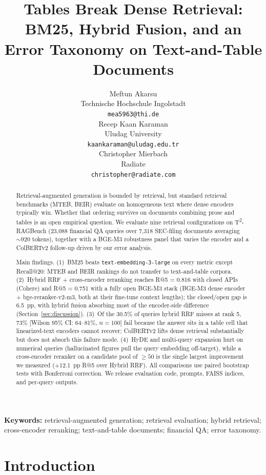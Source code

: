 \documentclass{article}
\title{Tables Break Dense Retrieval: BM25, Hybrid Fusion, and an Error Taxonomy on Text-and-Table Documents}
\author{
  Meftun Akarsu \\
  Technische Hochschule Ingolstadt \\
  \texttt{mea5963@thi.de} \\
  \And
  Recep Kaan Karaman \\
  Uludag University \\
  \texttt{kaankaraman@uludag.edu.tr} \\
  \And
  Christopher Mierbach \\
  Radiate \\
  \texttt{christopher@radiate.com}
}
\begin{document}
\maketitle

\begin{abstract}
Retrieval-augmented generation is bounded by retrieval, but standard retrieval benchmarks (MTEB, BEIR) evaluate on homogeneous text where dense encoders typically win. Whether that ordering survives on documents combining prose and tables is an open empirical question. We evaluate nine retrieval configurations on T\textsuperscript{2}-RAGBench (23{,}088 financial QA queries over 7{,}318 SEC-filing documents averaging ${\sim}920$ tokens), together with a BGE-M3 robustness panel that varies the encoder and a ColBERTv2 follow-up driven by our error analysis.

Main findings. (1)~BM25 beats \texttt{text-embedding-3-large} on every metric except Recall@20: MTEB and BEIR rankings do not transfer to text-and-table corpora. (2)~Hybrid RRF + cross-encoder reranking reaches R@5 = 0.816 with closed APIs (Cohere) and R@5 = 0.751 with a fully open BGE-M3 stack (BGE-M3 dense encoder + bge-reranker-v2-m3, both at their fine-tune context lengths); the closed/open gap is 6.5~pp, with hybrid fusion absorbing most of the encoder-side difference (Section~\ref{sec:discussion}). (3)~Of the 30.5\% of queries hybrid RRF misses at rank 5, 73\% [Wilson 95\% CI: 64--81\%, $n=100$] fail because the answer sits in a table cell that linearized-text encoders cannot recover; ColBERTv2 lifts dense retrieval substantially but does not absorb this failure mode. (4)~HyDE and multi-query expansion hurt on numerical queries (hallucinated figures pull the query embedding off-target), while a cross-encoder reranker on a candidate pool of $\geq 50$ is the single largest improvement we measured (+12.1~pp R@5 over Hybrid RRF). All comparisons use paired bootstrap tests with Bonferroni correction. We release evaluation code, prompts, FAISS indices, and per-query outputs.
\end{abstract}

\noindent\textbf{Keywords:} retrieval-augmented generation; retrieval evaluation; hybrid retrieval; cross-encoder reranking; text-and-table documents; financial QA; error taxonomy.

\section{Introduction}
\label{sec:intro}
\end{document}
